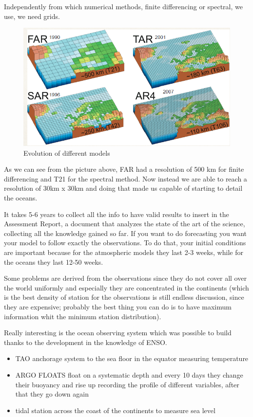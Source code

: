 Independently from which numerical methods, finite differencing or spectral, we use, we need grids.
\begin{figure}[htp!]
	\centering
	\includegraphics[width=0.4\linewidth]{uploads/Screenshot 2024-11-20 213227.png}
	\caption{Evolution of different models}
	\label{fig:enter-label}
\end{figure}
As we can see from the picture above, FAR had a resolution of 500 km for finite differencing and T21 for the spectral method. Now instead we are able to reach a resolution of 30km x 30km and doing that made us capable of starting to detail the oceans.

It takes 5-6 years to collect all the info to have valid results to insert in the Assessment Report, a document that analyzes the state of the art of the science, collecting all the knowledge gained so far.
If you want to do forecasting you want your model to follow exactly the observations. To do that, your initial conditions are important because for the atmospheric models they last 2-3 weeks, while for the oceans they last 12-50 weeks.

Some problems are derived from the observations since they do not cover all over the world uniformly and especially they are concentrated in the continents (which is the best density of station for the observations is still endless discussion, since they are expensive; probably the best thing you can do is to have maximum information whit the minimum station distribution).

Really interesting is the ocean observing system which was possible to build thanks to the development in the knowledge of ENSO.
\begin{itemize}
	\item TAO anchorage system to the sea floor in the equator measuring temperature
	\item  ARGO FLOATS float on a systematic depth and every 10 days they change their buoyancy and rise up recording the profile of different variables, after that they go down again
	\item tidal station across the coast of the continents to measure sea level
\end{itemize}

